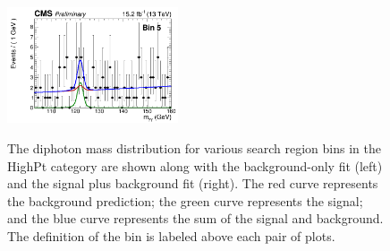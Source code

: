 \begin{figure}[ht!]
\includegraphics[width=0.45\textwidth, angle=0.]{figs/unblindedResults2p3Plus12p9/bin5_fit_s.png}\\
\caption{ The diphoton mass distribution for various search region bins in the HighPt category 
are shown along with the background-only fit (left) and the signal plus background fit (right). 
The red curve represents the background prediction; the green curve represents the signal; 
and the blue curve represents the sum of the signal and background. The definition of the bin
is labeled above each pair of plots.
\label{fig:UnblindedResultsHighPt2}}
\end{figure}


